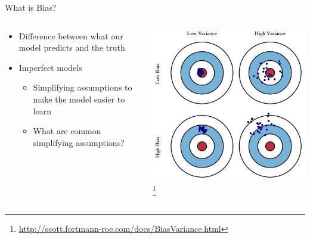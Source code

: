 \documentclass[aspectratio=169]{beamer}
\begin{document}
\begin{frame}{What is Bias?}

\begin{columns}
\begin{column}{0.5\textwidth}
\begin{itemize}
\item Difference between what our model predicts and the truth
\item Imperfect models
	\begin{itemize}
	\item Simplifying assumptions to make the model easier to learn
	\item What are common simplifying assumptions? 
	\end{itemize}
\end{itemize}
\end{column}
\begin{column}{0.5\textwidth}
\includegraphics[width=1\textwidth]{./lectReg/bias-and-variance.jpg}
\footnote{\url{http://scott.fortmann-roe.com/docs/BiasVariance.html}}
\end{column}
\end{columns}

\end{frame}
\end{document}
